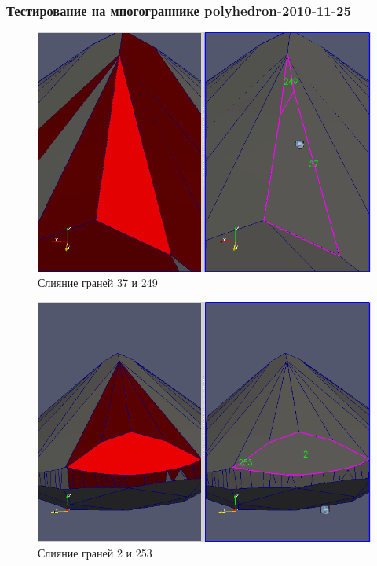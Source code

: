 \documentclass[a4paper,12pt, titlepage]{article}
\begin{document}
\subsubsection{Тестирование на многограннике polyhedron-2010-11-25}
\begin{flushleft}
  \begin{figure}[h]
    \includegraphics[clip, width=13cm]{polyhedron-2010-11-25/37-249.png}
    \caption{Слияние граней 37 и 249}\label{poly1-1}
  \end{figure}
\end{flushleft}
\begin{flushleft}
  \begin{figure}[h]
    \includegraphics[clip, width=13cm]{polyhedron-2010-11-25/2-253.png}
    \caption{Слияние граней 2 и 253}\label{poly1-2}
  \end{figure}
\end{flushleft}
\end{document}
